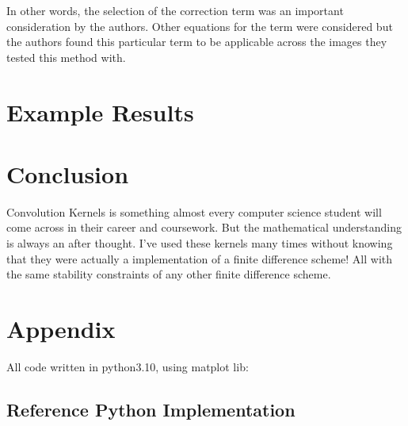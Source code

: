 \documentclass{article}
\begin{document}
In other words, the selection of the correction term was an important consideration by the authors. Other equations for the term were considered but the authors found this particular term to be applicable across the images they tested this method with.

\section*{Example Results}

\section*{Conclusion}
Convolution Kernels is something almost every computer science student will come across in their career and coursework. But the mathematical understanding is always an after thought. I've used these kernels many times without knowing that they were actually a implementation of a finite difference scheme! All with the same stability constraints of any other finite difference scheme.

\section*{Appendix}
All code written in python3.10, using matplot lib:
\subsection*{Reference Python Implementation} \label{code1.3.1}

\end{document}
